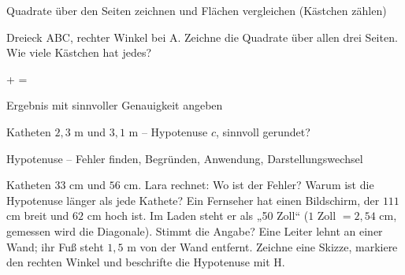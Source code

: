 \begin{aufgabe}{Quadrate über den Seiten zeichnen und Flächen vergleichen (Kästchen zählen)}
\begin{teile}
\teil Dreieck ABC, rechter Winkel bei A. Zeichne die Quadrate über allen drei Seiten. Wie viele Kästchen hat jedes?

\begin{ksys}[xmin=0,xmax=10,ymin=0,ymax=9]    \end{ksys}
\leerfeld + \leerfeld = \leerfeld
\end{teile}
\end{aufgabe}

\begin{aufgabe}{Ergebnis mit sinnvoller Genauigkeit angeben}
\begin{teile}
\teil Katheten $2{,}3$ m und $3{,}1$ m – Hypotenuse $c$, sinnvoll gerundet? \leerfeld[m]
\end{teile}
\end{aufgabe}

\begin{aufgabe}{Hypotenuse – Fehler finden, Begründen, Anwendung, Darstellungswechsel}
\begin{teile}
\teil Katheten $33$ cm und $56$ cm. Lara rechnet:  Wo ist der Fehler?
\teil Warum ist die Hypotenuse länger als jede Kathete?
\teil Ein Fernseher hat einen Bildschirm, der $111$ cm breit und $62$ cm hoch ist. Im Laden steht er als „50 Zoll“ ($1$ Zoll $= 2{,}54$ cm, gemessen wird die Diagonale). Stimmt die Angabe?
\teil Eine Leiter lehnt an einer Wand; ihr Fuß steht $1{,}5$ m von der Wand entfernt. Zeichne eine Skizze, markiere den rechten Winkel und beschrifte die Hypotenuse mit H.

\end{teile}
\end{aufgabe}
